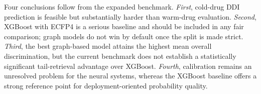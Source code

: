 Four conclusions follow from the expanded benchmark. \textit{First}, cold-drug DDI prediction is feasible but substantially harder than warm-drug evaluation. \textit{Second}, XGBoost with ECFP4 is a serious baseline and should be included in any fair comparison; graph models do not win by default once the split is made strict. \textit{Third}, the best graph-based model attains the highest mean overall discrimination, but the current benchmark does not establish a statistically significant tail-retrieval advantage over XGBoost. \textit{Fourth}, calibration remains an unresolved problem for the neural systems, whereas the XGBoost baseline offers a strong reference point for deployment-oriented probability quality.
